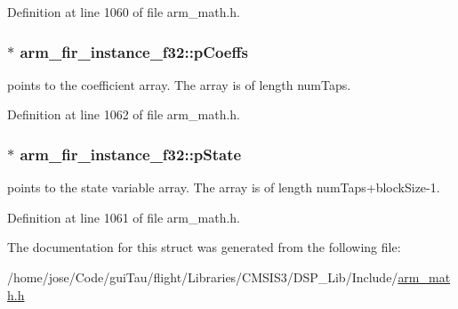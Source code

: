 Definition at line 1060 of file arm\-\_\-math.\-h.

\hypertarget{structarm__fir__instance__f32_a1c9cfca901d5902afeb640f2831488f4}{
\subsubsection[{p\-Coeffs}]{$\ast$ arm\-\_\-fir\-\_\-instance\-\_\-f32\-::p\-Coeffs}}\label{structarm__fir__instance__f32_a1c9cfca901d5902afeb640f2831488f4}
points to the coefficient array. The array is of length num\-Taps. 

Definition at line 1062 of file arm\-\_\-math.\-h.

\hypertarget{structarm__fir__instance__f32_a7afcf4022e8560db9b8fd28b0d090a15}{
\subsubsection[{p\-State}]{$\ast$ arm\-\_\-fir\-\_\-instance\-\_\-f32\-::p\-State}}\label{structarm__fir__instance__f32_a7afcf4022e8560db9b8fd28b0d090a15}
points to the state variable array. The array is of length num\-Taps+block\-Size-\/1. 

Definition at line 1061 of file arm\-\_\-math.\-h.



The documentation for this struct was generated from the following file\-:\begin{DoxyCompactItemize}
\item 
/home/jose/\-Code/gui\-Tau/flight/\-Libraries/\-C\-M\-S\-I\-S3/\-D\-S\-P\-\_\-\-Lib/\-Include/\hyperlink{arm__math_8h}{arm\-\_\-math.\-h}\end{DoxyCompactItemize}
